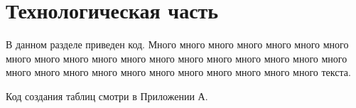 \chapter{Технологическая часть}

В данном разделе приведен код. Много много много много много много много много много много много много много много много много много много много много много много много много много много много много много много текста.

Код создания таблиц смотри в Приложении А.

%
%
